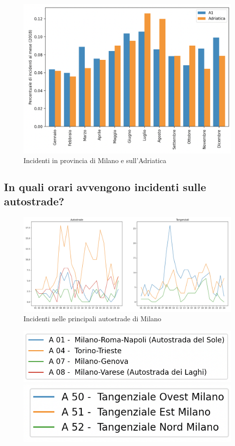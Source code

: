 \documentclass[a4paper]{report}
\begin{document}
\begin{figure}
    \includegraphics[width=\linewidth]{../src/incidenti/incidenti_aci/autostrade/milano_adriatica.png}
    \caption{Incidenti in provincia di Milano e sull'Adriatica}
    \label{fig:milano-adriatica}
\end{figure}


\subsection{In quali orari avvengono incidenti sulle autostrade?}

\begin{figure}
    \includegraphics[width=\linewidth]{../src/incidenti/incidenti_aci/autostrade/tangenziali_autostrade.png}
    \caption{Incidenti nelle principali autostrade di Milano}
    \label{fig:tangenziali-autostrade}
\end{figure}

\begin{figure}
    \includegraphics[width=0.6\linewidth]{../src/incidenti/incidenti_aci/autostrade/legenda_autostrade.png}
    \includegraphics[width=0.45\linewidth]{../src/incidenti/incidenti_aci/autostrade/legenda_tangenziali.png}
\end{figure}
\end{document}
